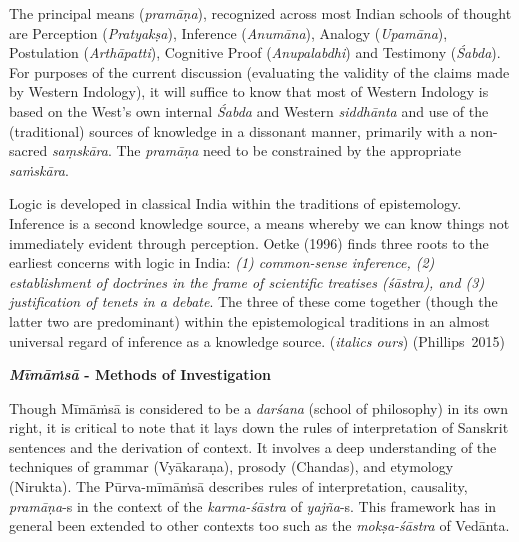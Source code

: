 The principal means ({\sl pramāṇa}), recognized across most Indian schools of thought are Perception ({\sl Pratyakṣa}), Inference ({\sl Anumāna}), Analogy ({\sl Upamāna}), Postulation ({\sl Arthāpatti}), Cognitive Proof ({\sl Anupalabdhi}) and Testimony ({\sl Śabda}). For purposes of the current discussion (evaluating the validity of the claims made by Western Indology), it will suffice to know that most of Western Indology is based on the West's own internal {\sl Śabda} and Western {\sl siddhānta} and use of the (traditional) sources of knowledge in a dissonant manner,  primarily with a non-sacred {\sl saṃ\-skāra}. The {\sl pramāṇa} need to be constrained by the appropriate {\sl saṁskāra}.
\begin{myquote}
Logic is developed in classical India within the traditions of epistemology. Inference is a second knowledge source, a means whereby we can know things not immediately evident through perception. Oetke (1996) finds three roots to the earliest concerns with logic in India: {\sl (1) common-sense inference, (2) establishment of doctrines in the frame of scientific treatises (\sl śāstra\relax), and (3) justification of tenets in a debate}. The three of these come together (though the latter two are predominant) within the epistemological traditions in an almost universal regard of inference as a knowledge source. ({\sl italics ours})
\hfill \hbox{(Phillips 2015)}
\end{myquote}

\newpage

{\bf {\sl\bfseries Mīmāṁsā} - Methods of Investigation}

Though Mīmāṁsā is considered to be a {\sl darśana} (school of philosophy) in its own right, it is critical to note that it lays down the rules of interpretation of Sanskrit sentences and the derivation of context. It involves a deep understanding of the techniques of grammar (Vyākaraṇa), prosody (Chandas), and etymology (Nirukta). The Pūrva-mīmāṁsā describes rules of interpretation, causality, {\sl pramāṇa}-s in the context of the {\sl karma-śāstra} of {\sl yajña}-s. This framework has in general been extended to other contexts too such as the {\sl mokṣa-śāstra} of Vedānta.

